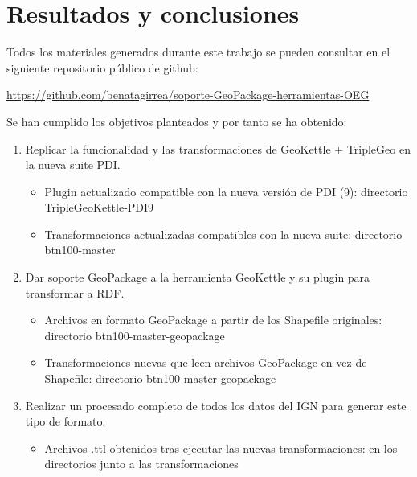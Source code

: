 \chapter{Resultados y conclusiones}

Todos los materiales generados durante este trabajo se pueden consultar en el siguiente repositorio público de
github: 

\href{https://github.com/benatagirrea/soporte-GeoPackage-herramientas-OEG}{https://github.com/benatagirrea/soporte-GeoPackage-herramientas-OEG}

Se han cumplido los objetivos planteados y por tanto se ha obtenido:

\begin{enumerate} 
    \item Replicar la funcionalidad y las transformaciones de GeoKettle + TripleGeo en la nueva suite PDI. 
        \begin{itemize}
        \item Plugin actualizado compatible con la nueva versión de PDI (9): directorio TripleGeoKettle-PDI9
        \item Transformaciones actualizadas compatibles con la nueva suite: directorio btn100-master
        \end{itemize}

    \item Dar soporte GeoPackage a la herramienta GeoKettle y su plugin para transformar a RDF. 
        \begin{itemize}
        \item Archivos en formato GeoPackage a partir de los Shapefile originales: directorio btn100-master-geopackage
        \item Transformaciones nuevas que leen archivos GeoPackage en vez de Shapefile: directorio btn100-master-geopackage
        \end{itemize}

    \item Realizar un procesado completo de todos los datos del IGN para generar este tipo de formato. 
        \begin{itemize}
        \item Archivos .ttl obtenidos tras ejecutar las nuevas transformaciones: en los directorios junto a las
            transformaciones
        \end{itemize}
\end{enumerate}

